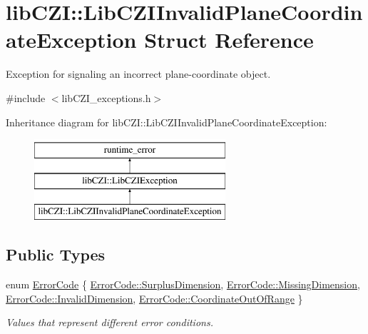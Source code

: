 \hypertarget{structlib_c_z_i_1_1_lib_c_z_i_invalid_plane_coordinate_exception}{}\section{lib\+C\+ZI\+:\+:Lib\+C\+Z\+I\+Invalid\+Plane\+Coordinate\+Exception Struct Reference}
\label{structlib_c_z_i_1_1_lib_c_z_i_invalid_plane_coordinate_exception}


Exception for signaling an incorrect plane-\/coordinate object.  




{\ttfamily \#include $<$lib\+C\+Z\+I\+\_\+exceptions.\+h$>$}

Inheritance diagram for lib\+C\+ZI\+:\+:Lib\+C\+Z\+I\+Invalid\+Plane\+Coordinate\+Exception\+:\begin{figure}[H]
\begin{center}
\leavevmode
\includegraphics[height=3.000000cm]{structlib_c_z_i_1_1_lib_c_z_i_invalid_plane_coordinate_exception}
\end{center}
\end{figure}
\subsection*{Public Types}
\begin{DoxyCompactItemize}
\item 
enum \hyperlink{structlib_c_z_i_1_1_lib_c_z_i_invalid_plane_coordinate_exception_a2e22a8936930f8e8de4b874764407b60}{Error\+Code} \{ \hyperlink{structlib_c_z_i_1_1_lib_c_z_i_invalid_plane_coordinate_exception_a2e22a8936930f8e8de4b874764407b60a2387177c5eeb2b0165fb975f4b741c55}{Error\+Code\+::\+Surplus\+Dimension}, 
\hyperlink{structlib_c_z_i_1_1_lib_c_z_i_invalid_plane_coordinate_exception_a2e22a8936930f8e8de4b874764407b60a06a04b63fba5058c3dc36269ef6dfaaa}{Error\+Code\+::\+Missing\+Dimension}, 
\hyperlink{structlib_c_z_i_1_1_lib_c_z_i_invalid_plane_coordinate_exception_a2e22a8936930f8e8de4b874764407b60a32718a726c2956f702be80643045a4e1}{Error\+Code\+::\+Invalid\+Dimension}, 
\hyperlink{structlib_c_z_i_1_1_lib_c_z_i_invalid_plane_coordinate_exception_a2e22a8936930f8e8de4b874764407b60a4a35479ed0f04e5d5ea428427869570b}{Error\+Code\+::\+Coordinate\+Out\+Of\+Range}
 \}\begin{DoxyCompactList}\small\item\em Values that represent different error conditions. \end{DoxyCompactList}
\end{DoxyCompactItemize}
